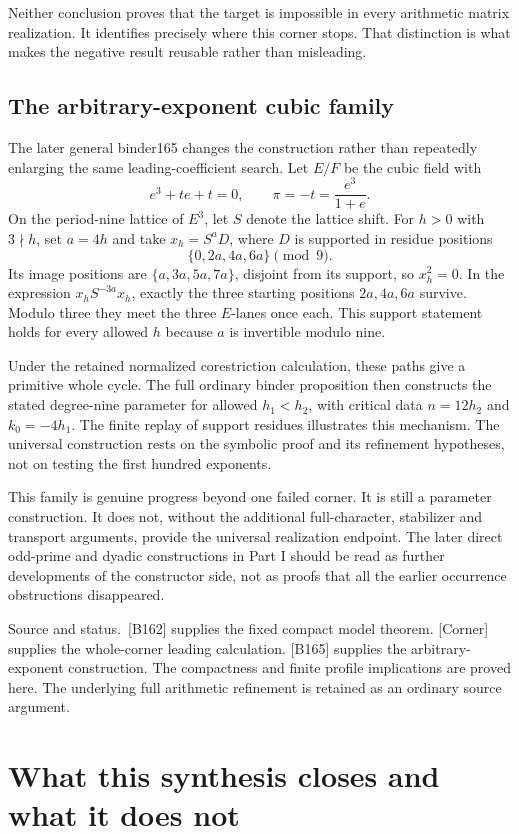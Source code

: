 \documentclass[11pt]{article}
\theoremstyle{definition}\newtheorem{definition}[proposition]{Definition}
\newcommand{\source}[1]{\par{\small\textsf{Source and status.}\ #1}\par}
\begin{document}
Neither conclusion proves that the target is impossible in every arithmetic matrix realization. It identifies precisely where this corner stops. That distinction is what makes the negative result reusable rather than misleading.

\subsection{The arbitrary-exponent cubic family}
The later general binder165 changes the construction rather than repeatedly enlarging the same leading-coefficient search. Let $E/F$ be the cubic field with
\[
 e^3+te+t=0,\qquad \pi=-t=\frac{e^3}{1+e}.
\]
On the period-nine lattice of $E^3$, let $S$ denote the lattice shift. For $h>0$ with $3\nmid h$, set $a=4h$ and take $x_h=S^aD$, where $D$ is supported in residue positions
\[
 \{0,2a,4a,6a\}\pmod9.
\]
Its image positions are $\{a,3a,5a,7a\}$, disjoint from its support, so $x_h^2=0$. In the expression $x_hS^{-3a}x_h$, exactly the three starting positions $2a,4a,6a$ survive. Modulo three they meet the three $E$-lanes once each. This support statement holds for every allowed $h$ because $a$ is invertible modulo nine.

Under the retained normalized corestriction calculation, these paths give a primitive whole cycle. The full ordinary binder proposition then constructs the stated degree-nine parameter for allowed $h_1<h_2$, with critical data $n=12h_2$ and $k_0=-4h_1$. The finite replay of support residues illustrates this mechanism. The universal construction rests on the symbolic proof and its refinement hypotheses, not on testing the first hundred exponents.

This family is genuine progress beyond one failed corner. It is still a parameter construction. It does not, without the additional full-character, stabilizer and transport arguments, provide the universal realization endpoint. The later direct odd-prime and dyadic constructions in Part I should be read as further developments of the constructor side, not as proofs that all the earlier occurrence obstructions disappeared.

\source{[B162] supplies the fixed compact model theorem. [Corner] supplies the whole-corner leading calculation. [B165] supplies the arbitrary-exponent construction. The compactness and finite profile implications are proved here. The underlying full arithmetic refinement is retained as an ordinary source argument.}

\section{What this synthesis closes and what it does not}\label{sec:synthesis}
\end{document}
